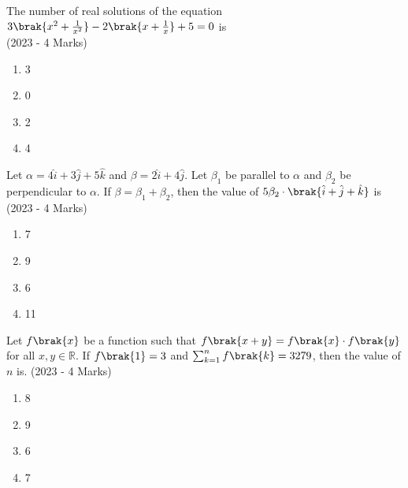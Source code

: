  \item{
    	
	    	The number of real solutions of the equation $3\brak{x^2 + \frac{1}{x^2}} - 2\brak{x + \frac{1}{x}}+5 =0$ is\\
	    	\text{   }\hfill
	    	{(2023 - 4 Marks)}
	    	\begin{multicols}{4}
	    		\begin{enumerate}
	    			\item 3
	    			\item 0
	    			\item 2
	    			\item 4
	    		\end{enumerate}
	    	\end{multicols}
	    	
	    }
    \item{
	
		    Let
		    $\alpha = 4\hat{i} + 3\hat{j} + 5\hat{k}$
		    and
		    $\beta = 2\hat{i} + 4\hat{j}$.
		    Let
		    $\beta_1$
		    be
		    parallel to
		    $\alpha$
		    and
		    $\beta_2$
		    be perpendicular to
		    $\alpha$.
		    If
		    $\beta = \beta_1 + \beta_2$,
		    then the value of
		    $5\beta_2\cdot\brak{\hat{i} + \hat{j} + \hat{k}}$
		    is
			\text{   }\hfill
			{(2023 - 4 Marks)}
			\begin{multicols}{4}
				\begin{enumerate}
						\item 7
						\item 9
						\item 6
						\item 11
				\end{enumerate}
			\end{multicols}
			
		}

    \item{
        
            Let $f\brak{x}$ be a function such that $f\brak{x+y} = f\brak{x}\cdot f\brak{y}$ for all $x, y \in \mathbb{R}$. If $f\brak{1} = 3$ and $\sum_{k=1}^{n} f\brak{k} = 3279$, then the value of $n$ is.\text{ }
             \hfill
              {(2023 - 4 Marks)}
			\begin{multicols}{2}              
	              		\begin{enumerate}
	              			\item 8
	              			\item 9
	              			\item 6
	              			\item 7
	              	\end{enumerate}
  			\end{multicols}      
        }



